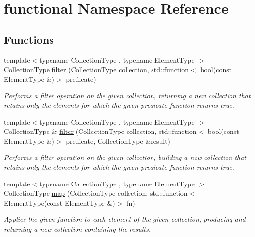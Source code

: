 \hypertarget{namespacefunctional}{}\section{functional Namespace Reference}
\label{namespacefunctional}
\subsection*{Functions}
\begin{DoxyCompactItemize}
\item 
{\footnotesize template$<$typename Collection\+Type , typename Element\+Type $>$ }\\Collection\+Type \mbox{\hyperlink{namespacefunctional_ae3bb7f21cd2f266a98d6ca42bea725bc}{filter}} (Collection\+Type collection, std\+::function$<$ bool(const Element\+Type \&)$>$ predicate)
\begin{DoxyCompactList}\small\item\em Performs a filter operation on the given collection, returning a new collection that retains only the elements for which the given predicate function returns true. \end{DoxyCompactList}\item 
{\footnotesize template$<$typename Collection\+Type , typename Element\+Type $>$ }\\Collection\+Type \& \mbox{\hyperlink{namespacefunctional_a842a5adba549e33315c451238f6bb6aa}{filter}} (Collection\+Type collection, std\+::function$<$ bool(const Element\+Type \&)$>$ predicate, Collection\+Type \&result)
\begin{DoxyCompactList}\small\item\em Performs a filter operation on the given collection, building a new collection that retains only the elements for which the given predicate function returns true. \end{DoxyCompactList}\item 
{\footnotesize template$<$typename Collection\+Type , typename Element\+Type $>$ }\\Collection\+Type \mbox{\hyperlink{namespacefunctional_a101598b614dde8ff3020b779fec982df}{map}} (Collection\+Type collection, std\+::function$<$ Element\+Type(const Element\+Type \&)$>$ fn)
\begin{DoxyCompactList}\small\item\em Applies the given function to each element of the given collection, producing and returning a new collection containing the results. \end{DoxyCompactList}\item 

\end{DoxyCompactItemize}
